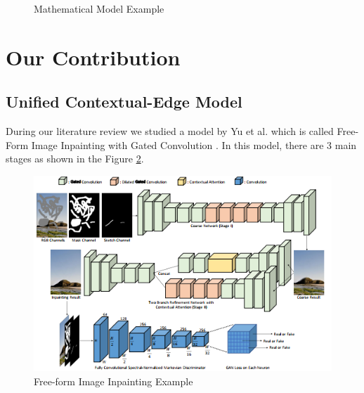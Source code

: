 \begin{figure}[!ht]
        \hspace{0.02\columnwidth}
        \vspace*{3mm}
        \caption{Mathematical Model Example}
    \label{fig:mathmodel}
\end{figure}

\section{Our Contribution}

\subsection{Unified Contextual-Edge Model}
During our literature review we studied a model by Yu et al. which is called Free-Form Image Inpainting with Gated Convolution \cite{freeform_inpainting}. In this model, there are 3 main stages as shown in the Figure \ref{fig:freeform}.

\begin{figure}[h!]
    \centering
    \includegraphics[scale=0.5]{figures/chapter5/Free-form.PNG}
    \vspace*{3mm}
    \caption{Free-form Image Inpainting Example \cite{freeform_inpainting}}
    \label{fig:freeform}
\end{figure}

